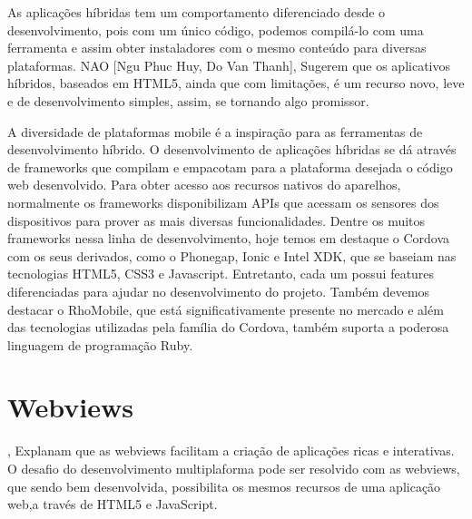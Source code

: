 As aplicações híbridas tem um comportamento diferenciado desde o desenvolvimento, pois com um único código, podemos compilá-lo com uma ferramenta e assim obter instaladores com o mesmo conteúdo para diversas plataformas. NAO [Ngu Phuc Huy, Do Van Thanh], Sugerem que os aplicativos híbridos, baseados em HTML5, ainda que com limitações, é um recurso novo, leve e de desenvolvimento simples, assim, se tornando algo promissor.


A diversidade de plataformas mobile é a inspiração para as ferramentas de desenvolvimento híbrido. O desenvolvimento de aplicações híbridas se dá através de frameworks que compilam e empacotam para a plataforma desejada o código web desenvolvido. Para obter acesso aos recursos nativos do aparelhos, normalmente os frameworks disponibilizam APIs que acessam os sensores dos dispositivos para prover as mais diversas funcionalidades. Dentre os muitos frameworks nessa linha de desenvolvimento, hoje temos em destaque o Cordova com os seus derivados, como o Phonegap, Ionic e Intel XDK, que se baseiam nas tecnologias HTML5, CSS3 e Javascript. Entretanto, cada um possui features diferenciadas para ajudar no desenvolvimento do projeto. Também devemos destacar o RhoMobile, que está significativamente presente no mercado e além das tecnologias utilizadas pela família do Cordova, também suporta a poderosa linguagem de programação Ruby.


\section{Webviews}


\cite{Chin2014}, Explanam que as webviews facilitam a criação de aplicações ricas e interativas. O desafio do desenvolvimento multiplaforma pode ser resolvido com as webviews, que sendo bem desenvolvida, possibilita os mesmos recursos de uma aplicação web,a través de HTML5 e JavaScript. 


